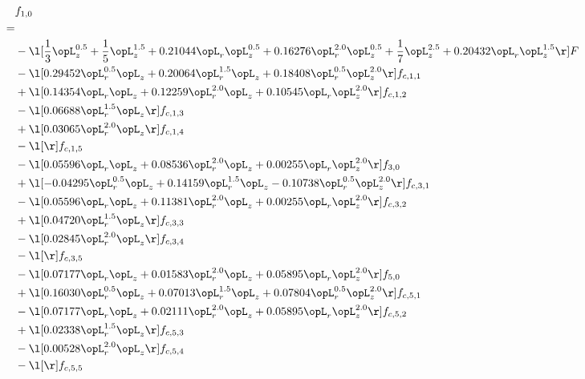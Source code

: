 \begin{alignat}{2} 
\label{eq:f_10_2} 
& f_{1,0} \nonumber \\ 
 = \\ 
& - \l[ \frac{1}{3} \opL_z^{0.5} + \frac{1}{5} \opL_z^{1.5} +  0.21044 \opL_r \opL_z^{0.5} +  0.16276 \opL_r^{2.0} \opL_z^{0.5} + \frac{1}{7} \opL_z^{2.5} +  0.20432 \opL_r \opL_z^{1.5}  \r] F \nonumber \\ 
& - \l[  0.29452 \opL_r^{0.5} \opL_z +  0.20064 \opL_r^{1.5} \opL_z +  0.18408 \opL_r^{0.5} \opL_z^{2.0}  \r] f_{c,1,1} \nonumber \\ 
& + \l[  0.14354 \opL_r \opL_z +  0.12259 \opL_r^{2.0} \opL_z +  0.10545 \opL_r \opL_z^{2.0}  \r] f_{c,1,2} \nonumber \\ 
& - \l[  0.06688 \opL_r^{1.5} \opL_z  \r] f_{c,1,3} \nonumber \\ 
& + \l[  0.03065 \opL_r^{2.0} \opL_z  \r] f_{c,1,4} \nonumber \\ 
& - \l[  \r] f_{c,1,5} \nonumber \\ 
& - \l[  0.05596 \opL_r \opL_z +  0.08536 \opL_r^{2.0} \opL_z +  0.00255 \opL_r \opL_z^{2.0}  \r] f_{3,0} \nonumber \\ 
& + \l[  -0.04295 \opL_r^{0.5} \opL_z +  0.14159 \opL_r^{1.5} \opL_z   -0.10738 \opL_r^{0.5} \opL_z^{2.0}  \r] f_{c,3,1} \nonumber \\ 
& - \l[  0.05596 \opL_r \opL_z +  0.11381 \opL_r^{2.0} \opL_z +  0.00255 \opL_r \opL_z^{2.0}  \r] f_{c,3,2} \nonumber \\ 
& + \l[  0.04720 \opL_r^{1.5} \opL_z  \r] f_{c,3,3} \nonumber \\ 
& - \l[  0.02845 \opL_r^{2.0} \opL_z  \r] f_{c,3,4} \nonumber \\ 
& - \l[  \r] f_{c,3,5} \nonumber \\ 
& - \l[  0.07177 \opL_r \opL_z +  0.01583 \opL_r^{2.0} \opL_z +  0.05895 \opL_r \opL_z^{2.0}  \r] f_{5,0} \nonumber \\ 
& + \l[  0.16030 \opL_r^{0.5} \opL_z +  0.07013 \opL_r^{1.5} \opL_z +  0.07804 \opL_r^{0.5} \opL_z^{2.0}  \r] f_{c,5,1} \nonumber \\ 
& - \l[  0.07177 \opL_r \opL_z +  0.02111 \opL_r^{2.0} \opL_z +  0.05895 \opL_r \opL_z^{2.0}  \r] f_{c,5,2} \nonumber \\ 
& + \l[  0.02338 \opL_r^{1.5} \opL_z  \r] f_{c,5,3} \nonumber \\ 
& - \l[  0.00528 \opL_r^{2.0} \opL_z  \r] f_{c,5,4} \nonumber \\ 
& - \l[  \r] f_{c,5,5} \nonumber \\ 

\end{alignat}
